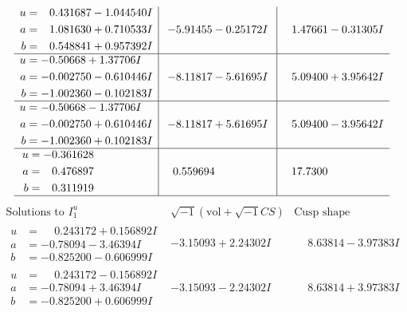 \documentclass[1p]{elsarticle_modified}
\theoremstyle{definition}
\newcommand{\I}{\sqrt{-1}}
\begin{document}
$$\begin{array}{c|c|c}
\begin{aligned}
u &= \phantom{-}0.431687 - 1.044540 I \\
a &= \phantom{-}1.081630 + 0.710533 I \\
b &= \phantom{-}0.548841 + 0.957392 I\end{aligned}
 & -5.91455 - 0.25172 I & \phantom{-}1.47661 - 0.31305 I \\ \hline\begin{aligned}
u &= -0.50668 + 1.37706 I \\
a &= -0.002750 - 0.610446 I \\
b &= -1.002360 - 0.102183 I\end{aligned}
 & -8.11817 - 5.61695 I & \phantom{-}5.09400 + 3.95642 I \\ \hline\begin{aligned}
u &= -0.50668 - 1.37706 I \\
a &= -0.002750 + 0.610446 I \\
b &= -1.002360 + 0.102183 I\end{aligned}
 & -8.11817 + 5.61695 I & \phantom{-}5.09400 - 3.95642 I \\ \hline\begin{aligned}
u &= -0.361628\phantom{ +0.000000I} \\
a &= \phantom{-}0.476897\phantom{ +0.000000I} \\
b &= \phantom{-}0.311919\phantom{ +0.000000I}\end{aligned}
 & \phantom{-}0.559694\phantom{ +0.000000I} & \phantom{-}17.7300\phantom{ +0.000000I}\\
 \hline 
 \end{array}$$\newpage$$\begin{array}{c|c|c}  
\text{Solutions to }I^u_{1}& \I (\text{vol} + \sqrt{-1}CS) & \text{Cusp shape}\\
 \hline 
\begin{aligned}
u &= \phantom{-}0.243172 + 0.156892 I \\
a &= -0.78094 - 3.46394 I \\
b &= -0.825200 - 0.606999 I\end{aligned}
 & -3.15093 + 2.24302 I & \phantom{-}8.63814 - 3.97383 I \\ \hline\begin{aligned}
u &= \phantom{-}0.243172 - 0.156892 I \\
a &= -0.78094 + 3.46394 I \\
b &= -0.825200 + 0.606999 I\end{aligned}
 & -3.15093 - 2.24302 I & \phantom{-}8.63814 + 3.97383 I \\ \hline\begin{aligned}

\end{aligned}
\end{array}$$
\end{document}
